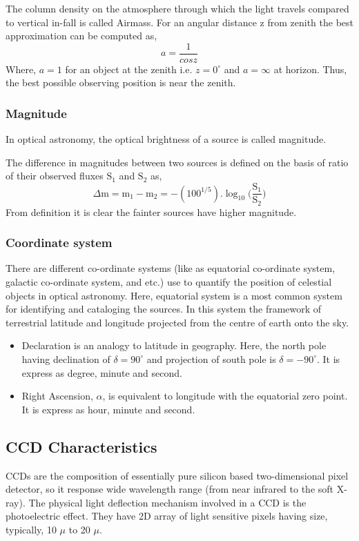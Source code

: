 The column density on the atmosphere through which the light travels compared to vertical in-fall is called Airmass. For an angular distance z from zenith the best approximation can be computed as,
\begin{equation}
	a=\frac{1}{cos z}
\end{equation}
Where, $ a=1 $ for an object at the zenith i.e. $ z= 0^{\circ} $ and $ a=\infty $ at horizon.
Thus, the best possible observing position is near the zenith.\\

\subsubsection{Magnitude}
In optical astronomy, the optical brightness of a source is called magnitude.

The difference in magnitudes between two sources is defined on the basis of ratio of their observed fluxes $ \text{S}_{1} $ and $ \text{S}_{2} $ as,
\begin{equation}
	\Delta \text{m}= \text{m}_{1}-\text{m}_{2}=-(100^{1/5}). \log_{10} \bigg(\frac{\text{S}_{1}}{\text{S}_{2}}\bigg)
\end{equation}
From definition it is clear the fainter sources have higher magnitude.\\

\subsubsection{Coordinate system}
There are different co-ordinate systems (like as equatorial co-ordinate system, galactic co-ordinate system, and etc.) use to quantify the position of celestial objects in optical astronomy. Here, equatorial system is a most common system for identifying and cataloging the sources. In this system the framework of terrestrial latitude and longitude projected from the centre of earth onto the sky.
\begin{itemize}
	\item Declaration is an analogy to latitude in geography. Here, the north pole having declination of $ \delta=90^{\circ} $ and projection of south pole is  $ \delta= -90^{\circ} $. It is express as degree, minute and second. 
	\item Right Ascension, $\alpha $, is equivalent to longitude with the equatorial zero point. It is express as hour, minute and second.
\end{itemize}

\subsection{CCD Characteristics}
CCDs are the composition of essentially pure silicon based two-dimensional pixel detector, so it response wide wavelength range (from near infrared to the soft X-ray). The physical  light deflection mechanism involved in a CCD is the photoelectric effect. They have 2D array of light sensitive pixels having size, typically,  10 $ \mu $ to 20 $ \mu $. \\ 


